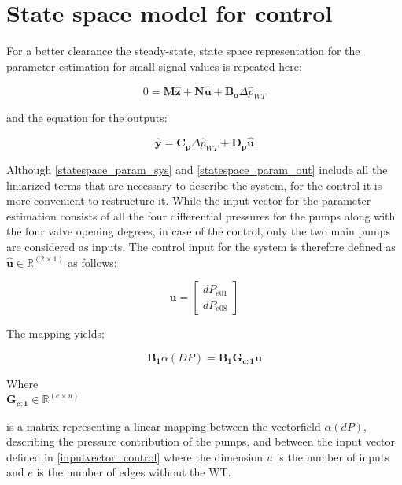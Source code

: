 \section{State space model for control}
 \label{SystemLin_control}
 
 For a better clearance the steady-state, state space representation for the parameter estimation for small-signal values is repeated here:
 
 \begin{equation}
 0 = \pmb{M} \pmb{\hat{z}} + \pmb{N} \pmb{\hat{u}} + \pmb{B_o} \Delta \hat{p}_{WT}    
 \label{statespace_param_sys}
\end{equation}

and the equation for the outputs:

\begin{equation}
  \pmb{\hat{y}} = \pmb{C_p} \Delta \hat{p}_{WT} + \pmb{D_p} \pmb{\hat{u}} 
   \label{statespace_param_out}
\end{equation}

Although \eqref{statespace_param_sys} and \eqref{statespace_param_out} include all the liniarized terms that are necessary to describe the system, for the control it is more convenient to restructure it. While the input vector for the parameter estimation consists of all the four differential pressures for the pumps along with the four valve opening degrees, in case of the control, only the two main pumps are considered as inputs. The control input for the system is therefore defined as $\pmb{\hat{u}} \in \pmb{\mathbb{R}}^{(2 \times 1)}$ as follows: 

\begin{equation}
\pmb{u} =
\begin{bmatrix} 
dP_{e01} \\
dP_{e08} 
\label{inputvector_control}
\end{bmatrix} 
\end{equation}

The mapping yields:

\begin{equation}
\pmb{B_1} \alpha(DP) = \pmb{B_1} \pmb{G_{c;1}} \pmb{u}
\label{mapping_main}
\end{equation}


\begin{minipage}[t]{0.20\textwidth}
Where\\
\hspace*{8mm} $\pmb{G_{c;1}} \in \pmb{\mathbb{R}}^{(e \times u)} $ 
\end{minipage}
\begin{minipage}[t]{0.68\textwidth}
\vspace*{2mm}
is a matrix representing a linear mapping between the vectorfield $\alpha(dP)$, describing the pressure contribution of the pumps, and between the input vector defined in \eqref{inputvector_control} where the dimension $u$ is the number of inputs and $e$ is the number of edges without the WT. 
\end{minipage} 

